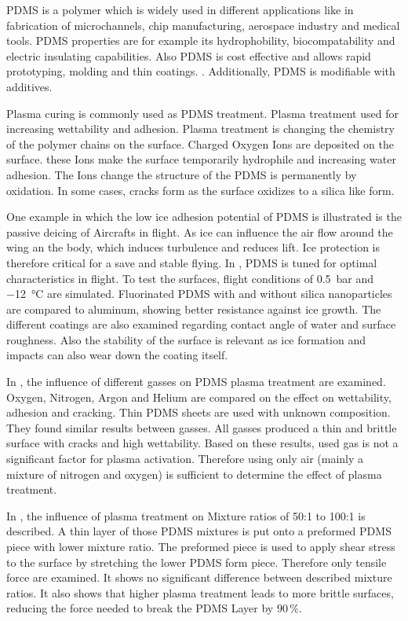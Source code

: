 PDMS is a polymer which is widely used in different applications like in fabrication of microchannels, chip manufacturing, aerospace industry and medical tools. PDMS properties are for example its hydrophobility, biocompatability and electric insulating capabilities. Also PDMS is cost effective and allows rapid prototyping, molding and thin coatings. \cite{Wolf.2018}. Additionally, PDMS is modifiable with additives.

Plasma curing is commonly used as PDMS treatment. Plasma treatment used for increasing wettability and adhesion. Plasma treatment is changing the chemistry of the polymer chains on the surface. Charged Oxygen Ions are deposited on the surface. these Ions make the surface temporarily hydrophile and increasing water adhesion. The Ions change the structure of the PDMS is permanently by oxidation. In some cases, cracks form as the surface oxidizes to a silica like form.

One example in which the low ice adhesion potential of PDMS is illustrated is the passive deicing of Aircrafts in flight. As ice can influence the air flow around the wing an the body, which induces turbulence and reduces lift. Ice protection is therefore critical for a save and stable flying. In \cite{Liu.2018}, PDMS is tuned for optimal characteristics in flight. To test the surfaces, flight conditions of \SI{0.5}{\bar} and \SI{-12}{\degreeCelsius} are simulated. Fluorinated PDMS with and without silica nanoparticles are compared to aluminum, showing better resistance against ice growth. The different coatings are also examined regarding contact angle of water and surface roughness. Also the stability of the surface is relevant as ice formation and impacts can also wear down the coating itself. 

In \cite{Owen.1994}, the influence of different gasses on PDMS plasma treatment are examined. Oxygen, Nitrogen, Argon and Helium are compared on the effect on wettability, adhesion and cracking. Thin PDMS sheets are used with unknown composition. They found similar results between gasses. All gasses produced a thin and brittle surface with cracks and high wettability. Based on these results, used gas is not a significant factor for plasma activation. Therefore using only air (mainly a mixture of nitrogen and oxygen) is sufficient to determine the effect of plasma treatment.

In \cite{Ohishi.2017}, the influence of plasma treatment on Mixture ratios of 50:1 to 100:1 is described. A thin layer of those PDMS mixtures is put onto a preformed PDMS piece with lower mixture ratio. The preformed piece is used to apply shear stress to the surface by stretching the lower PDMS form piece. Therefore only tensile force are examined. It shows no significant difference between described mixture ratios. It also shows that higher plasma treatment leads to more brittle surfaces, reducing the force needed to break the PDMS Layer by $90\,\%$.

